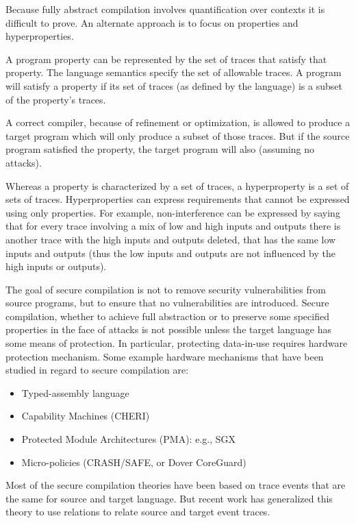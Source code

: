 Because fully abstract compilation involves quantification over contexts it is difficult to prove. An alternate approach is to focus on properties and hyperproperties.\autocite{20210614:clarkson}

A program property can be represented by the set of traces that satisfy that property. The language semantics specify the set of allowable traces. A program will satisfy a property if its set of traces (as defined by the language) is a subset of the property’s traces.

A correct compiler, because of refinement or optimization, is allowed to produce a target program which will only produce a subset of those traces. But if the source program satisfied the property, the target program will also (assuming no attacks).

Whereas a property is characterized by a set of traces, a hyperproperty is a set of sets of traces. Hyperproperties can express requirements that cannot be expressed using only properties. For example, non-interference can be expressed by saying that for every trace involving a mix of low and high inputs and outputs there is another trace with the high inputs and outputs deleted, that has the same low inputs and outputs (thus the low inputs and outputs are not influenced by the high inputs or outputs).

The goal of secure compilation is not to remove security vulnerabilities from source programs, but to ensure that no vulnerabilities are introduced. Secure compilation, whether to achieve full abstraction or to preserve some specified properties in the face of attacks is not possible unless the target language has some means of protection. In particular, protecting data-in-use requires hardware protection mechanism. Some example hardware mechanisms that have been studied in regard to secure compilation are:\autocites{20210614:busi}{20210614:patrignani}
\begin{itemize}
	\item Typed-assembly language
	\item Capability Machines (CHERI)
	\item Protected Module Architectures (PMA): e.g., SGX
	\item Micro-policies (CRASH/SAFE, or Dover CoreGuard)
\end{itemize}

Most of the secure compilation theories have been based on trace events that are the same for source and target language. But recent work has generalized this theory to use relations to relate source and target event traces.\autocite{20210614:abate}

